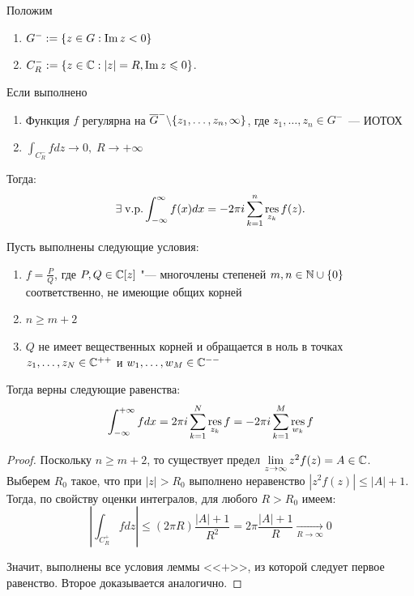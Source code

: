 \begin{lemma}[<<$-$>>]
	Положим
    \begin{enumerate}
        \item $G^- := \{z \in G: \operatorname{Im} z < 0\}$
        \item $C_R^- := \{z \in \mathbb{C}: |z| = R, \operatorname{Im} z \leqslant 0\}$.
    \end{enumerate}
    Если выполнено
	\begin{enumerate}
		\item Функция $f$ регулярна на $\overline{G}^- \backslash \{z_1, \dotsc, z_n, \infty\}$, где $z_1, \dotsc, z_n \in G^-$~--- ИОТОХ
		\item $\int_{C_R^-}fdz \to 0,\; R \to +\infty$
	\end{enumerate}
	
	Тогда:
	\[\exists\; \text{v.p.} \int_{-\infty}^{\infty} f(x) dx = -2\pi i \sum_{k = 1}^n \operatorname*{res}_{z_k}f(z).\]
\end{lemma}

\begin{theorem}
	Пусть выполнены следующие условия:
	\begin{enumerate}
		\item $f = \frac{P}{Q}$, где $P, Q \in \mathbb{C}[z]$ "--- многочлены степеней $m, n \in \mathbb{N} \cup \{0\}$ соответственно, не имеющие общих корней
		\item $n \geq m + 2$
		\item $Q$ не имеет вещественных корней и обращается в ноль в точках $z_1, \dotsc, z_N \in \mathbb{C}^{++}$ и $w_1, \dotsc, w_M \in \mathbb{C}^{--}$
	\end{enumerate}
	
	Тогда верны следующие равенства:
	\[\int_{-\infty}^{+\infty}fdx = 2\pi i\sum_{k=1}^N \operatorname*{res}_{z_k}f = -2\pi i\sum_{k=1}^M \operatorname*{res}_{w_k}f\]
\end{theorem}

\begin{proof}
	Поскольку $n \ge m + 2$, то существует предел $\lim\limits_{z \to \infty}z^2f(z) = A \in \mathbb{C}$. Выберем $R_0$ такое, что при $|z| > R_0$ выполнено неравенство $|z^2f(z)| \le |A| + 1$. Тогда, по свойству оценки интегралов, для любого $R > R_0$ имеем:
	\[\left|\int_{C_R^+}fdz\right| \le (2\pi R)\frac{|A| + 1}{R^2} = 2\pi\frac{|A| + 1}{R} \xrightarrow[R \to \infty]{} 0\]
	
	Значит, выполнены все условия леммы <<$+$>>, из которой следует первое равенство. Второе доказывается аналогично.
\end{proof}


